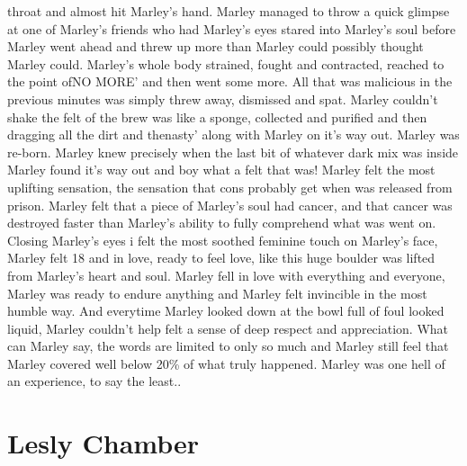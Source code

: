 \documentclass[12pt]{book}
\begin{document}
throat and almost hit Marley's hand. Marley managed to throw a quick glimpse at one of Marley's friends who had Marley's eyes stared into Marley's soul before Marley went ahead and threw up more than Marley could possibly thought Marley could. Marley's whole body strained, fought and contracted, reached to the point ofNO MORE' and then went some more. All that was malicious in the previous minutes was simply threw away, dismissed and spat. Marley couldn't shake the felt of the brew was like a sponge, collected and purified and then dragging all the dirt and thenasty' along with Marley on it's way out. Marley was re-born. Marley knew precisely when the last bit of whatever dark mix was inside Marley found it's way out and boy what a felt that was! Marley felt the most uplifting sensation, the sensation that cons probably get when was released from prison. Marley felt that a piece of Marley's soul had cancer, and that cancer was destroyed faster than Marley's ability to fully comprehend what was went on. Closing Marley's eyes i felt the most soothed feminine touch on Marley's face, Marley felt 18 and in love, ready to feel love, like this huge boulder was lifted from Marley's heart and soul. Marley fell in love with everything and everyone, Marley was ready to endure anything and Marley felt invincible in the most humble way. And everytime Marley looked down at the bowl full of foul looked liquid, Marley couldn't help felt a sense of deep respect and appreciation. What can Marley say, the words are limited to only so much and Marley still feel that Marley covered well below 20\% of what truly happened. Marley was one hell of an experience, to say the least..



\chapter{Lesly Chamber}
\end{document}
